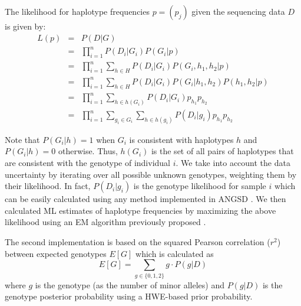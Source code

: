 \documentclass[a4paper]{article}
\begin{document}
The likelihood for haplotype frequencies $p=(p_j)$ given the sequencing data $D$ is given by:
\begin{eqnarray}
L(p)	&=& P(D | G) \\
		&=& \prod_{i=1}^n P(D_i|G_i) P(G_i|p) \\
        &=& \prod_{i=1}^n \sum_{h \in H} P(D_i|G_i) P(G_i, h_1,h_2|p) \\
        &=& \prod_{i=1}^n \sum_{h \in H} P(D_i|G_i) P(G_i|h_1,h_2) P(h_1,h_2 | p)\\
        &=& \prod_{i=1}^n \sum_{h \in h(G_i)} P(D_i|G_i) p_{h_1} p_{h_2} \\
        &=& \prod_{i=1}^n \sum_{g_i \in G_i} \sum_{h \in h(g_i)} P(D_i|g_i) p_{h_1} p_{h_2}
\end{eqnarray}

\noindent Note that $P(G_i|h)=1$ when $G_i$ is consistent with haplotypes $h$ and $P(G_i|h)=0$ otherwise. Thus, $h(G_i)$ is the set of all pairs of haplotypes that are consistent with the genotype of individual $i$. 
We take into account the data uncertainty by iterating over all possible unknown genotypes, weighting them by their likelihood. In fact, $P(D_i|g_i)$ is the genotype likelihood for sample $i$ which can be easily calculated using any method implemented in ANGSD \citep{Korneliussen2014}. We then calculated ML estimates of haplotype frequencies by maximizing the above likelihood using an EM algorithm previously proposed \citep{Moltke2015}.

The second implementation is based on the squared Pearson correlation ($r^2$) between expected genotypes $E[G]$ which is calculated as
\begin{equation}
	E[G] = \sum_{g \in \{0,1,2\}} g \cdot P(g|D)
\end{equation}
\noindent where $g$ is the genotype (as the number of minor alleles) and $P(g|D)$ is the genotype posterior probability using a HWE-based prior probability.
\end{document}
